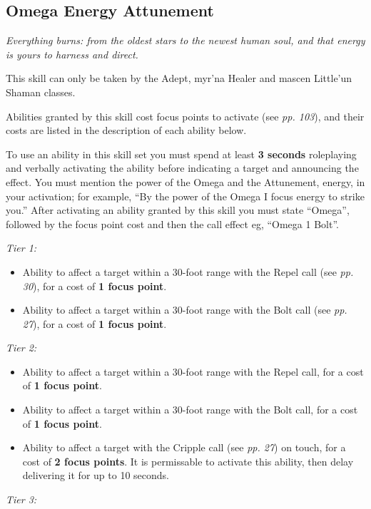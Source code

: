 \subsection{Omega Energy Attunement}

\textit{Everything burns: from the oldest stars to the newest human soul, and that energy is yours to harness and direct.}

This skill can only be taken by the Adept, myr'na Healer and mascen Little'un Shaman classes.

Abilities granted by this skill cost focus points to activate (see \textit{pp. 103}), and their costs are listed in the description of each ability below.

To use an ability in this skill set you must spend at least \textbf{3 seconds} roleplaying and verbally activating the ability before indicating a target and announcing the effect. You must mention the power of the Omega and the Attunement, energy, in your activation; for example, ``By the power of the Omega I focus energy to strike you.'' After activating an ability granted by this skill you must state ``Omega'', followed by the focus point cost and then the call effect eg, ``Omega 1 Bolt''.

\textit{Tier 1:}

\begin{itemize}
\item Ability to affect a target within a 30-foot range with the Repel call (see \textit{pp. 30}), for a cost of \textbf{1 focus point}.

\item Ability to affect a target within a 30-foot range with the Bolt call (see \textit{pp. 27}), for a cost of \textbf{1 focus point}.

\end{itemize}
\textit{Tier 2:}

\begin{itemize}
\item Ability to affect a target within a 30-foot range with the Repel call, for a cost of \textbf{1 focus point}.

\item Ability to affect a target within a 30-foot range with the Bolt call, for a cost of \textbf{1 focus point}.

\item Ability to affect a target with the Cripple call (see \textit{pp. 27}) on touch, for a cost of \textbf{2 focus points}. It is permissable to activate this ability, then delay delivering it for up to 10 seconds.

\end{itemize}
\textit{Tier 3:}

